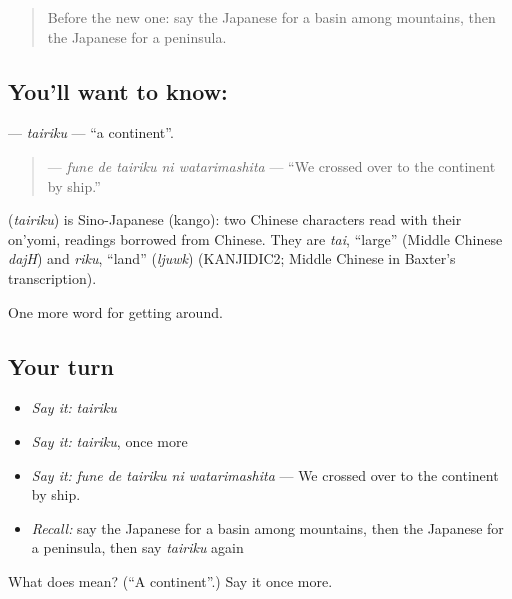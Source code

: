 \begin{quote}
Before the new one: say the Japanese for a basin among mountains, then the Japanese for a peninsula.
\end{quote}

\subsection*{You'll want to know: }
\textbf{} — \emph{tairiku} — \textquotedblleft{}a continent\textquotedblright{}.

\begin{quote}
\textbf{  } — \emph{fune de tairiku ni watarimashita} — \textquotedblleft{}We crossed over to the continent by ship.\textquotedblright{}
\end{quote}

\begin{cousinweb}
\textbf{} (\emph{tairiku}) is Sino-Japanese (kango): two Chinese characters read with their on'yomi, readings borrowed from Chinese. They are \emph{tai}, \textquotedblleft{}large\textquotedblright{} (Middle Chinese \emph{dajH}) and \emph{riku}, \textquotedblleft{}land\textquotedblright{} (\emph{ljuwk}) (KANJIDIC2; Middle Chinese in Baxter's transcription).
\end{cousinweb}

\begin{grammarlens}[title={What you've built}]
One more word for getting around.
\end{grammarlens}

\subsection*{Your turn}
\begin{itemize}
\raggedright
  \item \emph{Say it:} \emph{tairiku}
  \item \emph{Say it:} \emph{tairiku}, once more
  \item \emph{Say it:} \emph{fune de tairiku ni watarimashita} — We crossed over to the continent by ship.
  \item \emph{Recall:} say the Japanese for a basin among mountains, then the Japanese for a peninsula, then say \emph{tairiku} again
\end{itemize}

\begin{tcolorbox}[breakable,colback=teal!4,colframe=teal!35!black,title={Before you move on}]
What does  mean? (\textquotedblleft{}A continent\textquotedblright{}.) Say it once more.
\end{tcolorbox}
